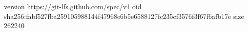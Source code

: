 version https://git-lfs.github.com/spec/v1
oid sha256:fabf527fba259105988144f47968e6b5e6588127fc235cf3576f3f67f6afb17e
size 262240
